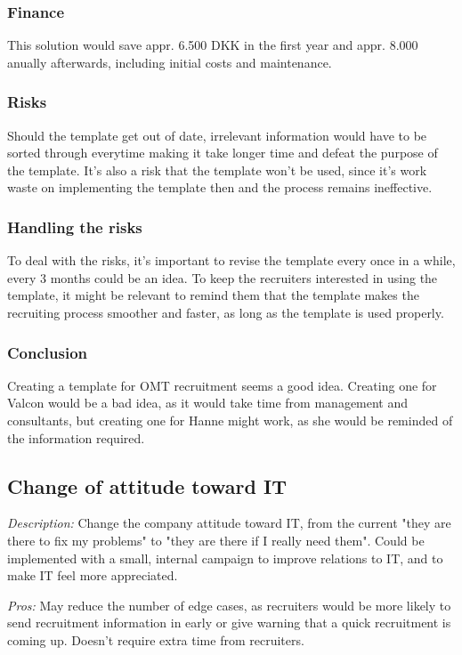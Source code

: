 \subsubsection{Finance}
This solution would save appr. 6.500 DKK in the first year and appr. 8.000 anually afterwards, including initial costs and maintenance.

\subsubsection{Risks}
Should the template get out of date, irrelevant information would have to be sorted through everytime making it take longer time and defeat the purpose of the template. 
It's also a risk that the template won't be used, since it's work waste on implementing the template then and the process remains ineffective.

\subsubsection{Handling the risks}
To deal with the risks, it's important to revise the template every once in a while, every 3 months could be an idea.
To keep the recruiters interested in using the template, it might be relevant to remind them that the template makes the recruiting process smoother and faster, as long as the template is used properly.

\subsubsection{Conclusion} Creating a template for OMT recruitment seems a good idea.
Creating one for Valcon would be a bad idea, as it would take time from management and consultants, but creating one for Hanne might work, as she would be reminded of the information required.

\subsection{Change of attitude toward IT}
\emph{Description:} Change the company attitude toward IT, from the current "they are there to fix my problems" to "they are there if I really need them".
Could be implemented with a small, internal campaign to improve relations to IT, and to make IT feel more appreciated.

\emph{Pros:} May reduce the number of edge cases, as recruiters would be more likely to send recruitment information in early or give warning that a quick recruitment is coming up.
Doesn't require extra time from recruiters.


